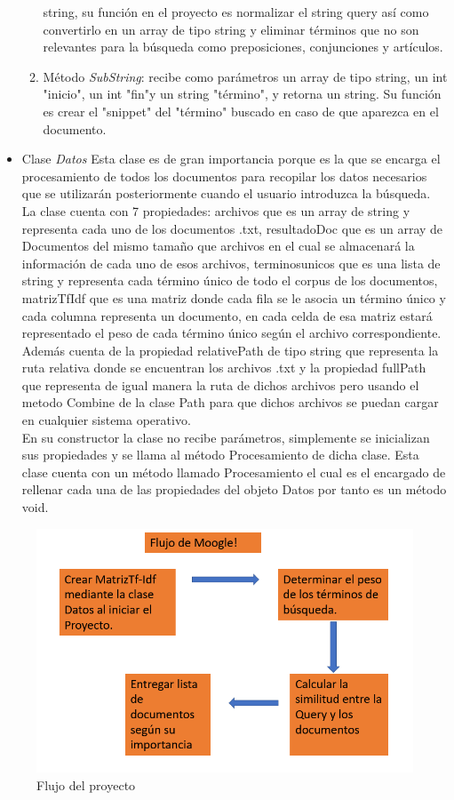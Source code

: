 \documentclass{article}
\begin{document}
\begin{itemize}
\begin{enumerate}
        string, su función en el proyecto es normalizar el string query así como convertirlo en un array de 
        tipo string y eliminar términos que no son relevantes para la búsqueda como preposiciones, conjunciones
         y artículos.
        \item Método \textit{SubString}: recibe como parámetros un array de tipo string, un int "inicio", 
        un int "fin"y un string "término", y retorna un string. Su función es crear el "snippet" del 
        "término" buscado en caso de que aparezca en el documento.
    \end{enumerate}
    \item Clase \textit{Datos}
    Esta clase es de gran importancia porque es la que se encarga el procesamiento de todos los documentos para recopilar
los datos necesarios que se utilizarán posteriormente cuando el usuario introduzca la búsqueda.\\
La clase cuenta con 7 propiedades: archivos que es un array de string y representa cada uno de los documentos .txt,
resultadoDoc que es un array de Documentos del mismo tamaño que archivos en el cual se almacenará la información
de cada uno de esos archivos, terminosunicos que es una lista de string y representa cada término único de todo el corpus de los 
documentos, matrizTfIdf que es una matriz donde cada fila se le asocia un término único 
y cada columna representa un documento, en cada celda de esa matriz estará representado el peso de cada término único según 
el archivo correspondiente. Además cuenta de la propiedad relativePath de tipo string que representa la ruta relativa donde se encuentran los 
archivos .txt y la propiedad fullPath que representa de igual manera la ruta de dichos archivos pero usando el metodo Combine
de la clase Path para que dichos archivos se puedan cargar en cualquier sistema operativo.\\
En su constructor la clase no recibe parámetros, simplemente se inicializan sus propiedades y se llama al método Procesamiento de dicha clase.
Esta clase cuenta con un método llamado Procesamiento el cual es el encargado de rellenar cada una de las propiedades del 
objeto Datos por tanto es un método void.
\end{itemize}
\newpage
\begin{figure}[h]
    \center
    \includegraphics[width=12cm]{flujoM.png}
    \caption{Flujo del proyecto}
\end{figure}
\end{document}
